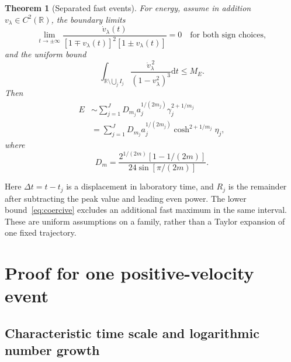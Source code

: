\documentclass[11pt]{article}
\newcommand{\dd}{\mathrm d}
\newcommand{\R}{\mathbb R}
\newtheorem{theorem}{Theorem}
\begin{document}
\begin{theorem}[Separated fast events]
For energy, assume in addition $v_\lambda\in C^2(\R)$,
the boundary limits
\begin{equation}
 \lim_{t\to\pm\infty}
 \frac{\dot v_\lambda(t)}{[1\mp v_\lambda(t)]^2[1\pm v_\lambda(t)]}=0
 \quad\text{for both sign choices},
 \label{eq:stress-boundaries}
\end{equation}
and the uniform bound
\begin{equation}
 \int_{\R\setminus\bigcup_j I_j}
       \frac{\dot v_\lambda^{\,2}}{(1-v_\lambda^2)^3}\dd t\le M_E.
 \label{eq:outer-energy-bound}
\end{equation}
Then
\begin{equation}
 \begin{aligned}
 E&\sim\sum_{j=1}^J D_{m_j}a_j^{1/(2m_j)}
                              \gamma_j^{2+1/m_j}\\
  &=\sum_{j=1}^J D_{m_j}a_j^{1/(2m_j)}
                              \cosh^{2+1/m_j}\eta_j,
 \end{aligned}
 \label{eq:localE}
\end{equation}
where
\begin{equation}
 D_m=\frac{2^{1/(2m)}[1-1/(2m)]}{24\sin[\pi/(2m)]}.
 \label{eq:local-energy-coefficient}
\end{equation}
\end{theorem}

Here $\Delta t=t-t_j$ is a displacement in laboratory time, and
$R_j$ is the remainder after subtracting the peak value and leading
even power. The lower bound~\eqref{eq:coercive} excludes an additional
fast maximum in the same interval. These are uniform assumptions on
a family, rather than a Taylor expansion of one fixed trajectory.

\section{Proof for one positive-velocity event}
\subsection{Characteristic time scale and logarithmic number growth}
\label{app:local-scaling}
\end{document}

